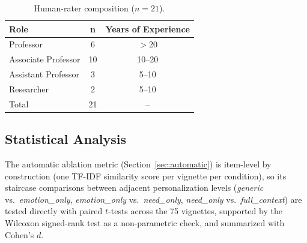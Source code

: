 \documentclass[higheredu,article,submit,pdftex,moreauthors]{Definitions/mdpi}
\begin{document}
\begin{table}[H]
\caption{Human-rater composition ($n=21$).\label{tab:raters}}
\begin{tabularx}{\textwidth}{XCC}
\toprule
\textbf{Role} & \textbf{n} & \textbf{Years of Experience} \\
\midrule
Professor & 6 & $>$20 \\
Associate Professor & 10 & 10--20 \\
Assistant Professor & 3 & 5--10 \\
Researcher & 2 & 5--10 \\
\midrule
Total & 21 & -- \\
\bottomrule
\end{tabularx}
\end{table}

\subsection{Statistical Analysis}
\label{sec:statanalysis}

The automatic ablation metric (Section~\ref{sec:automatic}) is item-level by construction (one TF-IDF similarity score per vignette per condition), so its staircase comparisons between adjacent personalization levels (\textit{generic} vs.\ \textit{emotion\_only}, \textit{emotion\_only} vs.\ \textit{need\_only}, \textit{need\_only} vs.\ \textit{full\_context}) are tested directly with paired $t$-tests across the 75 vignettes, supported by the Wilcoxon signed-rank test as a non-parametric check, and summarized with Cohen's $d$.
\end{document}
